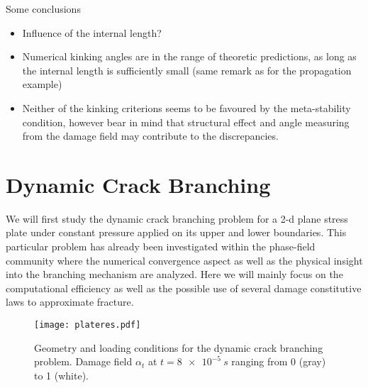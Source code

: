 Some conclusions
\begin{itemize}
\item Influence of the internal length?
\item Numerical kinking angles are in the range of theoretic predictions, as long as the internal length is sufficiently small (same remark as for the propagation example)
\item Neither of the kinking criterions seems to be favoured by the meta-stability condition, however bear in mind that structural effect and angle measuring from the damage field may contribute to the discrepancies.
\end{itemize}

\section{Dynamic Crack Branching} \label{sec:branching}
We will first study the dynamic crack branching problem for a 2-d plane stress plate under constant pressure applied on its upper and lower boundaries. This particular problem has already been investigated within the phase-field community \cite{BordenVerhooselScottHughesLandis:2012,SchlueterWillenbuecherKuhnMueller:2014} where the numerical convergence aspect as well as the physical insight into the branching mechanism are analyzed. Here we will mainly focus on the computational efficiency as well as the possible use of several damage constitutive laws to approximate fracture.
\begin{figure}[htbp]
\centering
\texttt{[image: plateres.pdf]}
\caption{Geometry and loading conditions for the dynamic crack branching problem. Damage field $\alpha_t$ at $t=\SI{8e-5}{s}$ ranging from 0 (gray) to 1 (white).} \label{fig:branching}
\end{figure}

